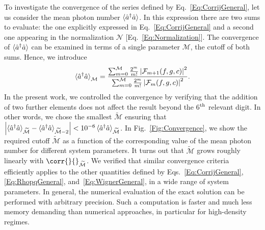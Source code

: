 To investigate the convergence of the series defined by Eq.~\eqref{Eq:CorrijGeneral}, let us consider the mean photon number $\braket{\hat{a}^\dagger\hat{a}}$.
In this expression there are two sums to evaluate: the one explicitly expressed in Eq.~\eqref{Eq:CorrijGeneral} and a second one appearing in the normalization ${\mathcal{N}}$ [Eq.~\eqref{Eq:Normalization}].
The convergence of $\braket{\hat{a}^\dagger\hat{a}}$ can be examined in terms of a single parameter $\mathcal{M}$, the cutoff of both sums.
Hence, we introduce
\begin{equation}\label{Eq:MeanPhotPartial}
\braket{\hat{a}^\dagger\hat{a}}_\mathcal{M}=
\frac{\sum_{m=0}^\mathcal{M} \frac{2^m}{m!}  \left|\mathcal{F}_{m+1}(f,g,c)\right|^2}
{\sum_{m=0}^\mathcal{M} \frac{2^m}{m!}  \left|\mathcal{F}_m(f,g,c)\right|^2}.
\end{equation}
In the present work, we controlled the convergence by verifying that the addition of two further elements does not affect the result beyond the 6$^{\rm th}$ relevant digit.
In other words, we chose the smallest $\widetilde{\mathcal{M}}$ ensuring that
$\left|
\braket{\hat{a}^\dagger\hat{a}}_{\widetilde{\mathcal{M}}}-
\braket{\hat{a}^\dagger\hat{a}}_{\widetilde{\mathcal{M}}-2}
\right|<10^{-6}\braket{\hat{a}^\dagger\hat{a}}_{\widetilde{\mathcal{M}}}$.
In Fig.~\ref{Fig:Convergence}, we show the required cutoff $\widetilde{\mathcal{M}}$ as a function of the corresponding value of the mean photon number for different system parameters.
It turns out that $\widetilde{\mathcal{M}}$ grows roughly linearly with $\corr{}{}_{\widetilde{\mathcal{M}}}$.
We verified that similar convergence criteria efficiently applies to the other quantities defined by Eqs.~\eqref{Eq:CorrijGeneral}, \eqref{Eq:RhopqGeneral}, and~\eqref{Eq:WignerGeneral}, in a wide range of system parameters.
In general, the numerical evaluation of the exact solution can be performed with arbitrary precision.
Such a computation is faster and much less memory demanding than numerical approaches, in particular for high-density regimes.


